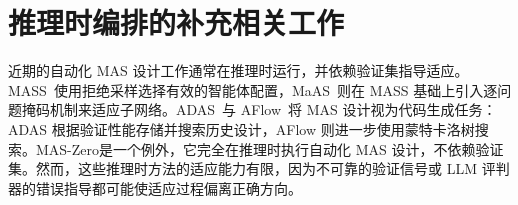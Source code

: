 \section{推理时编排的补充相关工作}
\label{ap:related}

近期的自动化 MAS 设计工作通常在推理时运行，并依赖验证集指导适应。MASS~\citep{zhou2025multiagentdesignoptimizingagents}使用拒绝采样选择有效的智能体配置，MaAS~\citep{zhang2025multiagentarchitecturesearchagentic}则在 MASS 基础上引入逐问题掩码机制来适应子网络。ADAS~\citep{hu2025automated}与 AFlow~\citep{zhang2024aflowautomatingagenticworkflow}将 MAS 设计视为代码生成任务：ADAS 根据验证性能存储并搜索历史设计，AFlow 则进一步使用蒙特卡洛树搜索。MAS-Zero\citep{Ke2025MASZero}是一个例外，它完全在推理时执行自动化 MAS 设计，不依赖验证集。然而，这些推理时方法的适应能力有限，因为不可靠的验证信号或 LLM 评判器的错误指导都可能使适应过程偏离正确方向。
